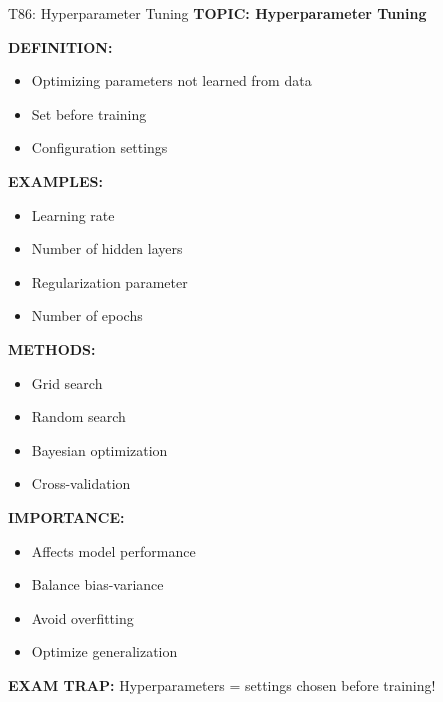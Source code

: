 \documentclass[8pt]{beamer}
\begin{document}
	\begin{frame}{T86: Hyperparameter Tuning}
		\fontsize{6.5}{7.5}\selectfont
		\textbf{TOPIC: Hyperparameter Tuning}
		
		\vspace{0.1cm}
		\textbf{DEFINITION:}
		\begin{itemize}
			\item Optimizing parameters not learned from data
			\item Set before training
			\item Configuration settings
		\end{itemize}
		
		\vspace{0.1cm}
		\textbf{EXAMPLES:}
		\begin{itemize}
			\item Learning rate
			\item Number of hidden layers
			\item Regularization parameter
			\item Number of epochs
		\end{itemize}
		
		\vspace{0.1cm}
		\textbf{METHODS:}
		\begin{itemize}
			\item Grid search
			\item Random search
			\item Bayesian optimization
			\item Cross-validation
		\end{itemize}
		
		\vspace{0.1cm}
		\textbf{IMPORTANCE:}
		\begin{itemize}
			\item Affects model performance
			\item Balance bias-variance
			\item Avoid overfitting
			\item Optimize generalization
		\end{itemize}
		
		\textcolor{myred}{\textbf{EXAM TRAP:}} Hyperparameters = \textcolor{myblue}{settings chosen before training}!
	\end{frame}
	
\end{document}

